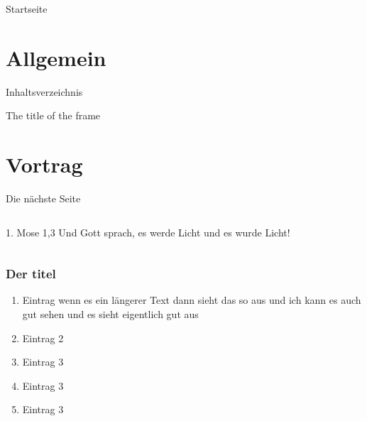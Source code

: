 \documentclass{beamer}
\begin{document}
\begin{frame}{Startseite}
\titlepage
\end{frame}
\section{Allgemein}
\begin{frame}{Inhaltsverzeichnis}
    \tableofcontents
\end{frame}

\begin{frame}{The title of the frame}
    \lipsum[10]
\end{frame}


\section{Vortrag}
\begin{frame}{Die nächste Seite}
    \begin{columns}
    \begin{block}{1. Mose 1,3}
        Und Gott sprach, es werde Licht und es wurde Licht!
    \end{block}
    \pause
    \end{columns}  
\end{frame}
\begin{frame}%
\frametitle{Der titel}
    \begin{enumerate}
        \item Eintrag wenn es ein längerer Text dann sieht das so aus und ich kann es auch gut sehen und es sieht eigentlich gut aus
        \item Eintrag 2
        \item Eintrag 3
        \item Eintrag 3
        \item Eintrag 3
    \end{enumerate}  
\end{frame}
\end{document}
